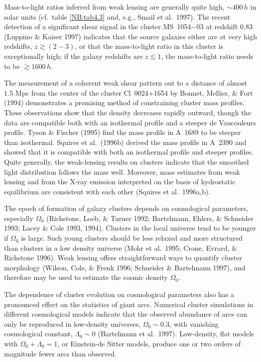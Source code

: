 \documentclass[a4paper,10pt]{article} %
\newcommand{\la}{\lesssim}
\newcommand{\ga}{\gtrsim}
\begin{document}
Mass-to-light ratios inferred from weak lensing are generally quite
high, $\sim400\,h$ in solar units (cf.\ table \ref{NB:tab4.3} and,
e.g., Smail et al.\ 1997). The recent detection of a significant
shear signal in the cluster MS~1054$-$03 at redshift $0.83$ (Luppino
\& Kaiser 1997) indicates that the source galaxies either are at very
high redshifts, $z\ga(2-3)$, or that the mass-to-light ratio in this
cluster is exceptionally high; if the galaxy redshifts are $z\la1$,
the mass-to-light ratio needs to be $\ga1600\,h$.

The measurement of a coherent weak shear pattern out to a distance of
almost $1.5$ Mpc from the center of the cluster Cl~0024$+$1654 by
Bonnet, Mellier, \& Fort (1994) demonstrates a promising method of
constraining cluster mass profiles. These observations show that the
density decreases rapidly outward, though the data are compatible both
with an isothermal profile and a steeper de Vaucouleurs profile. Tyson
\& Fischer (1995) find the mass profile in A~1689 to be steeper than
isothermal. Squires et al.\ (1996b) derived the mass profile in A~2390
and showed that it is compatible with both an isothermal profile and
steeper profiles. Quite generally, the weak-lensing results on
clusters indicate that the smoothed light distribution follows the
mass well. Moreover, mass estimates from weak lensing and from the
X-ray emission interpreted on the basis of hydrostatic equilibrium are
consistent with each other (Squires et al.\ 1996a,b).

The epoch of formation of galaxy clusters depends on cosmological
parameters, especially $\Omega_0$ (Richstone, Loeb, \& Turner 1992;
Bartelmann, Ehlers, \& Schneider 1993; Lacey \& Cole 1993, 1994).
Clusters in the local universe tend to be younger if $\Omega_0$ is
large. Such young clusters should be less relaxed and more structured
than clusters in a low density universe (Mohr et al.\ 1995; Crone,
Evrard, \& Richstone 1996). Weak lensing offers straightforward ways
to quantify cluster morphology (Wilson, Cole, \& Frenk 1996; Schneider
\& Bartelmann 1997), and therefore may be used to estimate the cosmic
density $\Omega_0$.

The dependence of cluster evolution on cosmological parameters also
has a pronounced effect on the statistics of giant arcs. Numerical
cluster simulations in different cosmological models indicate that the
observed abundance of arcs can only be reproduced in low-density
universes, $\Omega_0\sim0.3$, with vanishing cosmological constant,
$\Lambda_0\sim0$ (Bartelmann et al.\ 1997). Low-density, flat models
with $\Omega_0+\Lambda_0=1$, or Einstein-de Sitter models, produce one
or two orders of magnitude fewer arcs than observed.
\end{document}
